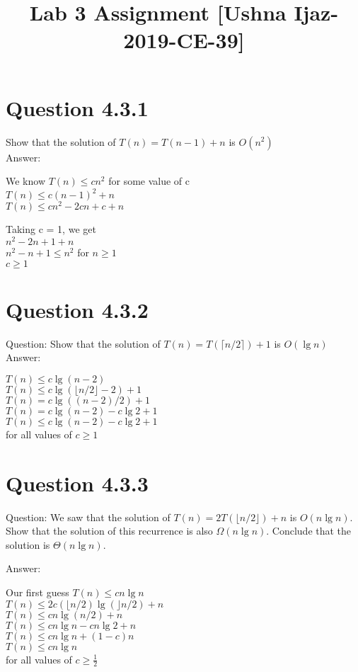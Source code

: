 \documentclass[12pt]{article}
\begin{document}
\title{Lab 3 Assignment [Ushna Ijaz- 2019-CE-39]}
\maketitle

\section{Question 4.3.1}
Show that the solution of $T(n) = T(n - 1) + n$ is $O(n^2)$\\ 

Answer: 

We know $T(n) \le cn^2$ for some value of c\\
$T(n) \le c(n-1)^2 + n$ \\
$T(n) \le cn^2 - 2cn + c + n $

Taking c = 1, we get\\
$ n^2 - 2n + 1 + n $ \\
$ n^2 - n + 1 \le n^2 $ for $n \ge 1$ \\
$c \ge 1$

\section{Question 4.3.2}
Question: Show that the solution of $T(n) = T(\lceil n / 2 \rceil) + 1$ is $O(\lg n)$ \\

Answer: 

$T(n) \le c\lg(n - 2)$ \\ 
$T(n) \le c\lg(\lfloor n / 2 \rfloor - 2) + 1$ \\
$T(n) = c\lg((n - 2)/2) + 1 $ \\ 
$T(n) = c\lg(n - 2) - c\lg2 + 1 $ \\ 
$T(n) \le c\lg(n - 2) - c\lg2 + 1 $ \\ 
for all values of $c \ge 1 $

\section{Question 4.3.3}
Question: We saw that the solution of $T(n) = 2T(\lfloor n / 2 \rfloor) + n$ is $O(n\lg n)$. Show that the solution of this recurrence is also $\Omega(n\lg n)$. Conclude that the solution is $\Theta(n\lg n)$.

Answer: 

Our first guess $T(n) \le cn\lg n $ \\ 
$T(n) \le 2c(\lfloor n / 2 ) \lg (\rfloor n / 2) + n$ \\
$T(n) \le cn \lg (n / 2) + n$\\
$T(n) \le cn \lg n - cn \lg 2 + n$ \\
$T(n) \le cn \lg n + (1 - c) n$ \\
$T(n) \le cn \lg n$ \\
for all values of $ c \ge \frac{1}{2} $
\end{document}

